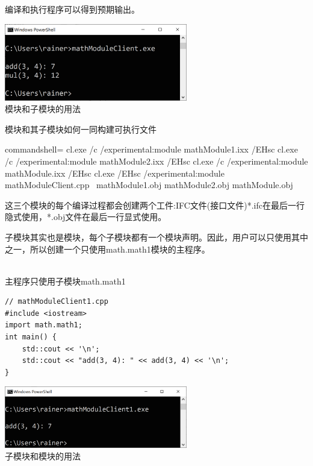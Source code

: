 编译和执行程序可以得到预期输出。

\begin{center}
\includegraphics[width=0.6\textwidth]{content/3/chapter4/images/21.png}\\
模块和子模块的用法
\end{center}

\begin{tcolorbox}[breakable,enhanced jigsaw,colback=blue!5!white,colframe=blue!75!black,title={使用Microsoft编译器构建可执行文件}]
	
模块和其子模块如何一同构建可执行文件

\begin{tcblisting}{commandshell={}}
cl.exe /c /experimental:module mathModule1.ixx /EHsc
cl.exe /c /experimental:module mathModule2.ixx /EHsc
cl.exe /c /experimental:module mathModule.ixx /EHsc
cl.exe /EHsc /experimental:module mathModuleClient.cpp \
  mathModule1.obj mathModule2.obj mathModule.obj
\end{tcblisting}

这三个模块的每个编译过程都会创建两个工件:IFC文件(接口文件)*.ifc在最后一行隐式使用，*.obj文件在最后一行显式使用。

\end{tcolorbox}

子模块其实也是模块，每个子模块都有一个模块声明。因此，用户可以只使用其中之一，所以创建一个只使用math.math1模块的主程序。

\hspace*{\fill} \\ %
\noindent
主程序只使用子模块math.math1
\begin{lstlisting}[style=styleCXX]
// mathModuleClient1.cpp
#include <iostream>
import math.math1;
int main() {
	std::cout << '\n';
	std::cout << "add(3, 4): " << add(3, 4) << '\n';
}
\end{lstlisting}

\begin{center}
\includegraphics[width=0.6\textwidth]{content/3/chapter4/images/22.png}\\
子模块和模块的用法
\end{center}

